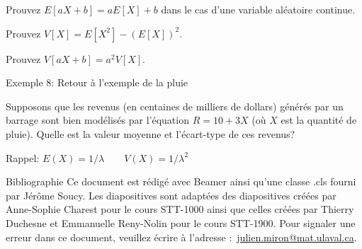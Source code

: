 \documentclass{BeamerTemplate}
\begin{document}
\begin{frame}[t]
Prouvez $E[aX+b]=aE[X]+b$ dans le cas d'une variable aléatoire continue.

\end{frame}

\begin{frame}[t]
Prouvez $V[X]=E[X^2]-(E[X])^2$.

\end{frame}

\begin{frame}[t]
Prouvez  $V[aX+b]=a^2V[X]$.

\end{frame}

\begin{frame}[t]{Exemple 8: Retour à l'exemple de la pluie}

Supposons que les revenus (en centaines de milliers de dollars)
générés par un barrage sont bien modélisés par l'équation $R=10+3X$ (où $X$ est la quantité de pluie). Quelle est la valeur
moyenne et l'écart-type de ces revenus?

Rappel: $E(X)=1/\lambda\qquad V(X)=1/\lambda^2$
\end{frame}



\begin{frame}{Bibliographie}
 	Ce document est rédigé avec Beamer ainsi qu'une classe .cls fourni par Jérôme Soucy. Les diapositives sont adaptées des diapositives créées par Anne-Sophie Charest 
 pour le cours STT-1000 ainsi que celles créées par Thierry Duchesne et Emmanuelle Reny-Nolin pour le cours STT-1900.
 	\printbibliography
 	\vfill
 	\footnotesize Pour signaler une erreur dans ce document, veuillez écrire à l'adresse :~\href{mailto:julien.miron@mat.ulaval.ca}{julien.miron@mat.ulaval.ca}.
 \end{frame}
\end{document}
